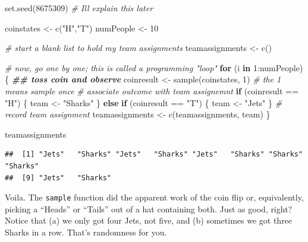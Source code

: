 \documentclass[
  openany]{book}
\newenvironment{Shaded}{\begin{snugshade}}{\end{snugshade}}
\newcommand{\CommentTok}[1]{\textcolor[rgb]{0.56,0.35,0.01}{\textit{#1}}}
\newcommand{\ControlFlowTok}[1]{\textcolor[rgb]{0.13,0.29,0.53}{\textbf{#1}}}
\newcommand{\DecValTok}[1]{\textcolor[rgb]{0.00,0.00,0.81}{#1}}
\newcommand{\DocumentationTok}[1]{\textcolor[rgb]{0.56,0.35,0.01}{\textbf{\textit{#1}}}}
\newcommand{\FunctionTok}[1]{\textcolor[rgb]{0.00,0.00,0.00}{#1}}
\newcommand{\NormalTok}[1]{#1}
\newcommand{\OtherTok}[1]{\textcolor[rgb]{0.56,0.35,0.01}{#1}}
\newcommand{\SpecialCharTok}[1]{\textcolor[rgb]{0.00,0.00,0.00}{#1}}
\newcommand{\StringTok}[1]{\textcolor[rgb]{0.31,0.60,0.02}{#1}}
\begin{document}
\begin{Shaded}
\begin{Highlighting}[]
\FunctionTok{set.seed}\NormalTok{(}\DecValTok{8675309}\NormalTok{) }\CommentTok{\# I\textquotesingle{}ll explain this later }

\NormalTok{coinstates }\OtherTok{\textless{}{-}} \FunctionTok{c}\NormalTok{(}\StringTok{"H"}\NormalTok{,}\StringTok{"T"}\NormalTok{)}
\NormalTok{numPeople }\OtherTok{\textless{}{-}} \DecValTok{10}

\CommentTok{\# start a blank list to hold my team assignments}
\NormalTok{teamassignments }\OtherTok{\textless{}{-}} \FunctionTok{c}\NormalTok{()}

\CommentTok{\# now, go one by one; this is called a programming "loop"}
\ControlFlowTok{for}\NormalTok{ (i }\ControlFlowTok{in} \DecValTok{1}\SpecialCharTok{:}\NormalTok{numPeople) \{}
  \DocumentationTok{\#\# toss coin and observe}
\NormalTok{  coinresult }\OtherTok{\textless{}{-}} \FunctionTok{sample}\NormalTok{(coinstates, }\DecValTok{1}\NormalTok{) }\CommentTok{\# the 1 means sample once}
  \CommentTok{\# associate outcome with team assignemnt}
  \ControlFlowTok{if}\NormalTok{ (coinresult }\SpecialCharTok{==} \StringTok{"H"}\NormalTok{) \{}
\NormalTok{    team }\OtherTok{\textless{}{-}} \StringTok{"Sharks"}
\NormalTok{  \} }\ControlFlowTok{else} \ControlFlowTok{if}\NormalTok{ (coinresult }\SpecialCharTok{==} \StringTok{"T"}\NormalTok{) \{}
\NormalTok{    team }\OtherTok{\textless{}{-}} \StringTok{"Jets"}
\NormalTok{  \}}
  \CommentTok{\# record team assignment}
\NormalTok{  teamassignments }\OtherTok{\textless{}{-}} \FunctionTok{c}\NormalTok{(teamassignments, team)}
\NormalTok{\}}

\NormalTok{teamassignments}
\end{Highlighting}
\end{Shaded}

\begin{verbatim}
##  [1] "Jets"   "Sharks" "Jets"   "Sharks" "Jets"   "Sharks" "Sharks" "Sharks"
##  [9] "Jets"   "Sharks"
\end{verbatim}

Voila. The \texttt{sample} function did the apparent work of the coin flip or, equivalently, picking a ``Heads'' or ``Tails'' out of a hat containing both. Just as good, right? Notice that (a) we only got four Jets, not five, and (b) sometimes we got three Sharks in a row. That's randomness for you.
\end{document}
